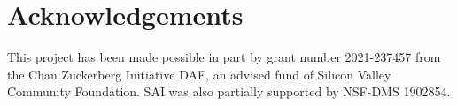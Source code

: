 \documentclass{juliacon}
\begin{document}
\section{Acknowledgements}
This project has been made possible in part by grant number 2021-237457 from the Chan Zuckerberg Initiative DAF, an advised fund of Silicon Valley Community Foundation. SAI was also partially supported by NSF-DMS 1902854.



\end{document}
